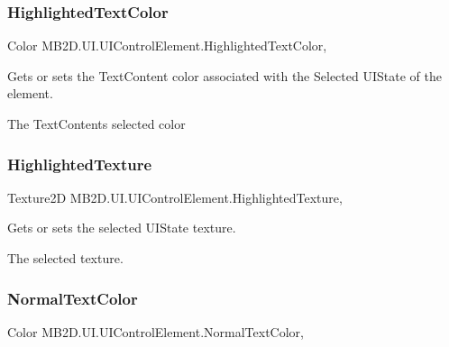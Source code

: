 \subsubsection{\texorpdfstring{Highlighted\+Text\+Color}{HighlightedTextColor}}
{\footnotesize\ttfamily Color M\+B2\+D.\+U\+I.\+U\+I\+Control\+Element.\+Highlighted\+Text\+Color\hspace{0.3cm}{\ttfamily [get]}, {\ttfamily [set]}}



Gets or sets the Text\+Content color associated with the Selected U\+I\+State of the element. 

The Text\+Contents selected color\hypertarget{class_m_b2_d_1_1_u_i_1_1_u_i_control_element_a0caea5b8e0a7b1af0a18bafff1d986b0}{}\label{class_m_b2_d_1_1_u_i_1_1_u_i_control_element_a0caea5b8e0a7b1af0a18bafff1d986b0} 
\subsubsection{\texorpdfstring{Highlighted\+Texture}{HighlightedTexture}}
{\footnotesize\ttfamily Texture2D M\+B2\+D.\+U\+I.\+U\+I\+Control\+Element.\+Highlighted\+Texture\hspace{0.3cm}{\ttfamily [get]}, {\ttfamily [set]}}



Gets or sets the selected U\+I\+State texture. 

The selected texture.\hypertarget{class_m_b2_d_1_1_u_i_1_1_u_i_control_element_a3f7eb009aa193cb3daf4057290b7d4ce}{}\label{class_m_b2_d_1_1_u_i_1_1_u_i_control_element_a3f7eb009aa193cb3daf4057290b7d4ce} 
\subsubsection{\texorpdfstring{Normal\+Text\+Color}{NormalTextColor}}
{\footnotesize\ttfamily Color M\+B2\+D.\+U\+I.\+U\+I\+Control\+Element.\+Normal\+Text\+Color\hspace{0.3cm}{\ttfamily [get]}, {\ttfamily [set]}}



